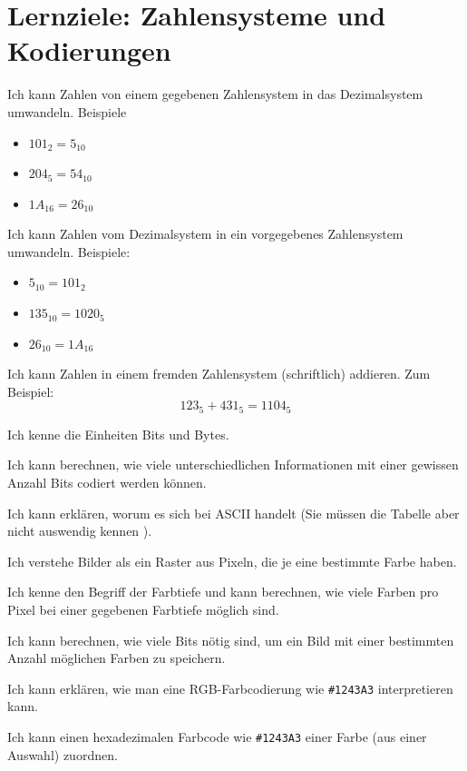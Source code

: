 \section*{Lernziele: Zahlensysteme und Kodierungen}
\begin{todolist}
\item Ich kann Zahlen von einem gegebenen Zahlensystem in das Dezimalsystem umwandeln. Beispiele
\begin{itemize}
\item $101_2 = 5_{10}$
\item $204_5 = 54_{10}$
\item $1A_{16} = 26_{10}$
\end{itemize}
\item Ich kann Zahlen vom Dezimalsystem in ein vorgegebenes Zahlensystem umwandeln. Beispiele:
\begin{itemize}
\item $5_{10} = 101_2$
\item $135_{10}=1020_5$
\item $26_{10}=1A_{16}$
\end{itemize}
\item Ich kann Zahlen in einem fremden Zahlensystem (schriftlich) addieren. Zum Beispiel:
\[123_5 + 431_5 = 1104_5\]
\item Ich kenne die Einheiten Bits und Bytes.
\item Ich kann berechnen, wie viele unterschiedlichen Informationen mit einer gewissen Anzahl Bits codiert werden können.
\item Ich kann erklären, worum es sich bei ASCII handelt (Sie müssen die Tabelle aber nicht auswendig kennen ).
\item Ich verstehe Bilder als ein Raster aus Pixeln, die je eine bestimmte Farbe haben.
\item Ich kenne den Begriff der Farbtiefe und kann berechnen, wie viele Farben pro Pixel bei einer gegebenen Farbtiefe möglich sind.
\item Ich kann berechnen, wie viele Bits nötig sind, um ein Bild mit einer bestimmten Anzahl möglichen Farben zu speichern.
\item Ich kann erklären, wie man eine RGB-Farbcodierung wie \texttt{\#1243A3} interpretieren kann.
\item Ich kann einen hexadezimalen Farbcode wie \texttt{\#1243A3} einer Farbe (aus einer Auswahl) zuordnen.
\end{todolist}
